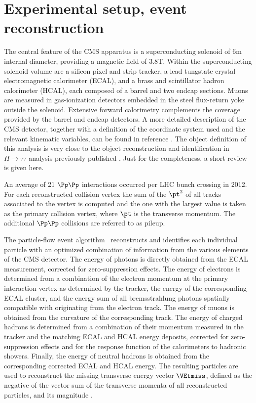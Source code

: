 \section{Experimental setup, event reconstruction}
\label{sect:CMSRec}


The central feature of the CMS apparatus is a superconducting solenoid of 6\unit{m} internal diameter, providing a magnetic field of 3.8\unit{T}. Within the superconducting solenoid volume are a silicon pixel and strip tracker, a lead tungstate crystal electromagnetic calorimeter (ECAL), and a brass and scintillator hadron calorimeter (HCAL), each composed of a barrel and two endcap sections. Muons are measured in gas-ionization detectors embedded in the steel flux-return yoke outside the solenoid. Extensive forward calorimetry complements the coverage provided by the barrel and endcap detectors. 
A more detailed description of the CMS detector, together with a definition of the coordinate system used and the relevant kinematic variables, can be found in reference \cite{Chatrchyan:2008zzk}.
The object definition of this analysis is very close to the object reconstruction and identification in $H\to\tau\tau$ analysis previously published \cite{Khachatryan:2014wca}. Just for the completeness, a short review is given here. 


An average of 21 $\Pp\Pp$ interactions occurred per LHC bunch crossing in 2012.
For each reconstructed collision vertex the sum of the  $\pt^2$ of all tracks associated to the vertex is computed and the one with the largest value is taken as the primary collision vertex, where $\pt$ is the transverse momentum. The additional $\Pp\Pp$ collisions are referred to as pileup. 



The particle-flow event algorithm~\cite{CMS-PAS-PFT-09-001,CMS-PAS-PFT-10-001} reconstructs and identifies each individual particle with an optimized combination of information from the various elements of the CMS detector. The energy of photons is directly obtained from the ECAL measurement, corrected for zero-suppression effects. The energy of electrons is determined from a combination of the electron momentum at the primary interaction vertex as determined by the tracker, the energy of the corresponding ECAL cluster, and the energy sum of all bremsstrahlung photons spatially compatible with originating from the electron track. The energy of muons is obtained from the curvature of the corresponding track. The energy of charged hadrons is determined from a combination of their momentum measured in the tracker and the matching ECAL and HCAL energy deposits, corrected for zero-suppression effects and for the response function of the calorimeters to hadronic showers. Finally, the energy of neutral hadrons is obtained from the corresponding corrected ECAL and HCAL energy. 
The resulting particles are used to reconstruct the missing transverse energy vector $\VEtmiss$, defined as the negative of the vector sum of the transverse momenta of all reconstructed particles, and its magnitude \MET.

